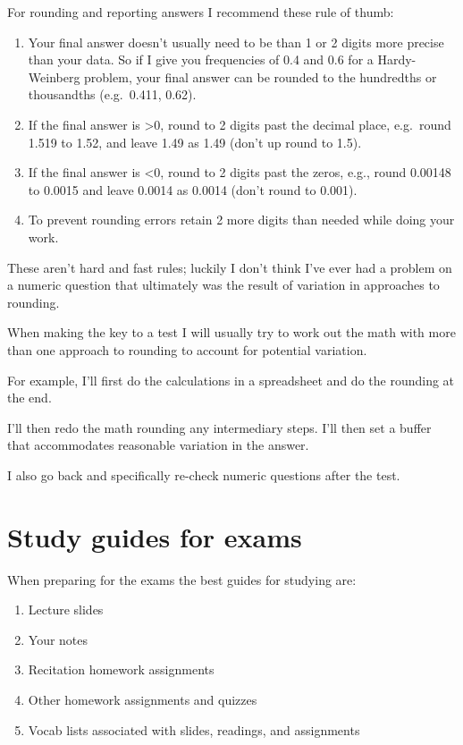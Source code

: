 \documentclass[
]{book}
\providecommand{\tightlist}{%
  \setlength{\itemsep}{0pt}\setlength{\parskip}{0pt}}
\begin{document}
For rounding and reporting answers I recommend these rule of thumb:

\begin{enumerate}
\def\labelenumi{\arabic{enumi}.}
\tightlist
\item
  Your final answer doesn't usually need to be than 1 or 2 digits more precise than your data. So if I give you frequencies of 0.4 and 0.6 for a Hardy-Weinberg problem, your final answer can be rounded to the hundredths or thousandths (e.g.~0.411, 0.62).
\item
  If the final answer is \textgreater0, round to 2 digits past the decimal place, e.g.~round 1.519 to 1.52, and leave 1.49 as 1.49 (don't up round to 1.5).
\item
  If the final answer is \textless0, round to 2 digits past the zeros, e.g., round 0.00148 to 0.0015 and leave 0.0014 as 0.0014 (don't round to 0.001).
\item
  To prevent rounding errors retain 2 more digits than needed while doing your work.
\end{enumerate}

These aren't hard and fast rules; luckily I don't think I've ever had a problem on a numeric question that ultimately was the result of variation in approaches to rounding.

When making the key to a test I will usually try to work out the math with more than one approach to rounding to account for potential variation.

For example, I'll first do the calculations in a spreadsheet and do the rounding at the end.

I'll then redo the math rounding any intermediary steps. I'll then set a buffer that accommodates reasonable variation in the answer.

I also go back and specifically re-check numeric questions after the test.

\hypertarget{study-guides-for-exams}{%
\chapter{Study guides for exams}\label{study-guides-for-exams}}

When preparing for the exams the best guides for studying are:

\begin{enumerate}
\def\labelenumi{\arabic{enumi}.}
\tightlist
\item
  Lecture slides
\item
  Your notes
\item
  Recitation homework assignments
\item
  Other homework assignments and quizzes
\item
  Vocab lists associated with slides, readings, and assignments
\end{enumerate}
\end{document}
